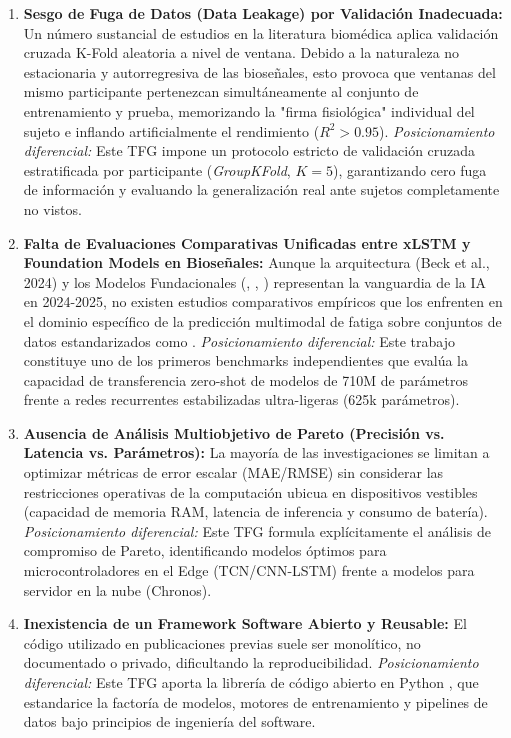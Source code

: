 \begin{enumerate}[label=\bfseries L\arabic*.]
    \item \textbf{Sesgo de Fuga de Datos (Data Leakage) por Validación Inadecuada:} Un número sustancial de estudios en la literatura biomédica aplica validación cruzada K-Fold aleatoria a nivel de ventana. Debido a la naturaleza no estacionaria y autorregresiva de las bioseñales, esto provoca que ventanas del mismo participante pertenezcan simultáneamente al conjunto de entrenamiento y prueba, memorizando la "firma fisiológica" individual del sujeto e inflando artificialmente el rendimiento ($R^2 > 0.95$). \textit{Posicionamiento diferencial:} Este TFG impone un protocolo estricto de validación cruzada estratificada por participante (\textit{GroupKFold}, $K=5$), garantizando cero fuga de información y evaluando la generalización real ante sujetos completamente no vistos.
    \item \textbf{Falta de Evaluaciones Comparativas Unificadas entre xLSTM y Foundation Models en Bioseñales:} Aunque la arquitectura \xlstm{} (Beck et al., 2024) y los Modelos Fundacionales (\chronos{}, \timesfm{}, \moment{}) representan la vanguardia de la IA en 2024-2025, no existen estudios comparativos empíricos que los enfrenten en el dominio específico de la predicción multimodal de fatiga sobre conjuntos de datos estandarizados como \fatigueset{}. \textit{Posicionamiento diferencial:} Este trabajo constituye uno de los primeros benchmarks independientes que evalúa la capacidad de transferencia zero-shot de modelos de 710M de parámetros frente a redes recurrentes estabilizadas ultra-ligeras (625k parámetros).
    \item \textbf{Ausencia de Análisis Multiobjetivo de Pareto (Precisión vs. Latencia vs. Parámetros):} La mayoría de las investigaciones se limitan a optimizar métricas de error escalar (MAE/RMSE) sin considerar las restricciones operativas de la computación ubicua en dispositivos vestibles (capacidad de memoria RAM, latencia de inferencia y consumo de batería). \textit{Posicionamiento diferencial:} Este TFG formula explícitamente el análisis de compromiso de Pareto, identificando modelos óptimos para microcontroladores en el Edge (TCN/CNN-LSTM) frente a modelos para servidor en la nube (Chronos).
    \item \textbf{Inexistencia de un Framework Software Abierto y Reusable:} El código utilizado en publicaciones previas suele ser monolítico, no documentado o privado, dificultando la reproducibilidad. \textit{Posicionamiento diferencial:} Este TFG aporta la librería de código abierto en Python , que estandarice la factoría de modelos, motores de entrenamiento y pipelines de datos bajo principios de ingeniería del software.
\end{enumerate}

